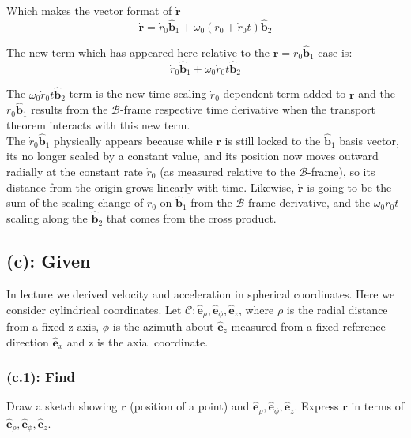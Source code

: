 \documentclass[titlepage]{article}
\begin{document}
\begin{mdframed}[linewidth=1pt, innertopmargin=10pt, innerbottommargin=10pt]
	Which makes the vector format of $\dot{\boldsymbol{r}}$
	\begin{equation}
		\dot{\boldsymbol{r}}=\dot{r}_0\hat{\boldsymbol{b}}_1+\omega_0\left(r_0+\dot{r}_0t\right)\hat{\boldsymbol{b}}_2
	\end{equation}
	
	The new term which has appeared here relative to the $\boldsymbol{r}=r_0\hat{\boldsymbol{b}}_1$ case is:
	\begin{equation}
		\dot{r}_0\hat{\boldsymbol{b}}_1+\omega_0\dot{r}_0t\hat{\boldsymbol{b}}_2
	\end{equation}
	
	The $\omega_0\dot{r}_0t\hat{\boldsymbol{b}}_2$ term is the new time scaling $\dot{r}_0$ dependent term added to $\boldsymbol{r}$ and the $\dot{r}_0\hat{\boldsymbol{b}}_1$ results from the $\mathcal{B}$-frame respective time derivative when the transport theorem interacts with this new term.\\
	
	The $\dot{r}_0\hat{\boldsymbol{b}}_1$ physically appears because while $\boldsymbol{r}$ is still locked to the $\hat{\boldsymbol{b}}_1$ basis vector, its no longer scaled by a constant value, and its position now moves outward radially at the constant rate $\dot{r}_0$ (as measured relative to the $\mathcal{B}$-frame), so its distance from the origin grows linearly with time. Likewise, $\dot{\boldsymbol{r}}$ is going to be the sum of the scaling change of $\dot{r}_0$ on $\hat{\boldsymbol{b}}_1$ from the $\mathcal{B}$-frame derivative, and the $\omega_0\dot{r}_0 t$ scaling along the $\hat{\boldsymbol{b}}_2$ that comes from the cross product.
\end{mdframed}

\subsection*{(c): Given}
In lecture we derived velocity and acceleration in spherical coordinates. Here we consider cylindrical coordinates. Let $\mathcal{C}:{\hat{\boldsymbol{e}}_{\rho},\hat{\boldsymbol{e}}_{\phi},\hat{\boldsymbol{e}}_{z}}$, where $\rho$ is the radial distance from a fixed z-axis, $\phi$ is the azimuth about $\hat{\boldsymbol{e}}_z$ measured from a fixed reference direction $\hat{\boldsymbol{e}}_x$ and z is the axial coordinate.

\subsubsection*{(c.1): Find}
Draw a sketch showing $\boldsymbol{r}$ (position of a point) and ${{\hat{\boldsymbol{e}}_{\rho},\hat{\boldsymbol{e}}_{\phi},\hat{\boldsymbol{e}}_{z}}}$. Express $\boldsymbol{r}$ in terms of ${\hat{\boldsymbol{e}}_{\rho},\hat{\boldsymbol{e}}_{\phi},\hat{\boldsymbol{e}}_{z}}$.\\
\end{document}
